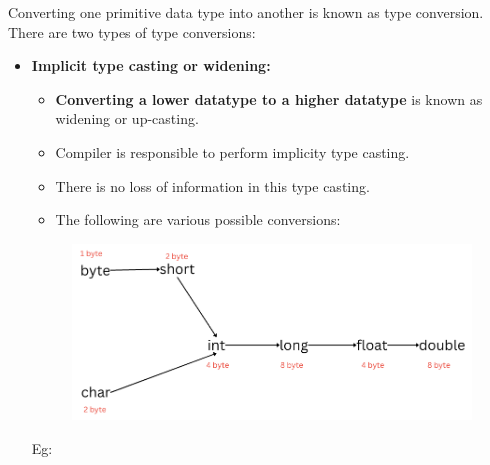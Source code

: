 

\begin{flushleft}

	
	Converting one primitive data type into another is known as type conversion. There are two types of type conversions:

	
	\begin{itemize}

		\item \textbf{Implicit type casting or widening:} 
		\begin{itemize}
			\item \textbf{Converting a lower datatype to a higher datatype} is known as widening or up-casting.
			\item Compiler is responsible to perform implicity type casting.
			\item There is no loss of information in this type casting.
			\item The following are various possible conversions:
		\end{itemize}
		

		
		\begin{figure}[h!]
			\centering
			\includegraphics[scale=.4]{content/chapter2/images/convert.png}

		\end{figure}		
		Eg:
	
		\bigskip
		

\end{itemize}
\end{flushleft}
